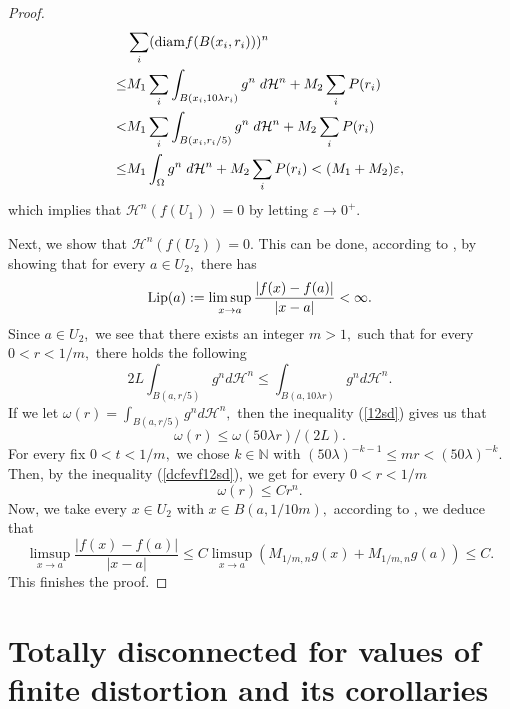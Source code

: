 \documentclass[11pt,twoside]{article}
\theoremstyle{definition}
\theoremstyle{remark}
\begin{document}
\begin{proof}
\begin{equation}
\begin{aligned}
&\sum_{i}({\rm diam}f(B(x_{i},r_{i})))^{n}\\
\leq& M_{1}\sum_{i}\int_{B(x_{i},10\lambda r_{i})}g^{n} \;d\mathcal{H}^{n}+M_{2}\sum_{i}P(r_{i})\\
<& M_{1}\sum_{i}\int_{B(x_{i}, r_{i}/5)}g^{n} \;d\mathcal{H}^{n} +M_{2}\sum_{i}P(r_{i})\\
\leq& M_{1}\int_{\Omega}g^{n} \;d\mathcal{H}^{n} +M_{2}\sum_{i}P(r_{i})<(M_{1}+M_{2})\varepsilon,\\
\end{aligned}
\end{equation}
which implies that $\mathcal{H}^{n}(f(U_{1}))=0$ by letting $\varepsilon\rightarrow0^{+}.$

Next, we show that $\mathcal{H}^{n}(f(U_{2}))=0.$ This can be done, according to \cite[Corollary 3.4 and Proposition 4.1.]{GO18}, by showing that for every 
$a\in U_{2},$ there has $${\rm Lip}(a):=\limsup_{x\rightarrow a}\frac{\vert{f(x)-f(a)\vert}}{\vert{x-a\vert}}<\infty.$$
Since $a\in U_{2},$ we see that there exists an integer $m>1,$ such that for every $0<r<1/m,$ there holds the following 
\begin{equation}\label{12sd}
2L\int_{B(a,r/5)}g^{n}d\mathcal{H}^{n}\leq\int_{B(a,10\lambda r)}g^{n}d\mathcal{H}^{n}.
\end{equation}\label{dcfevf12sd}
If we let $\omega(r)=\int_{B(a,r/5)}g^{n}d\mathcal{H}^{n},$ then the inequality (\ref{12sd}) gives us that 
\begin{equation}
\omega(r)\leq \omega(50\lambda r)/(2L).
\end{equation} For every fix $0<t<1/m,$ we chose 
$k\in \mathbb{N}$ with $(50\lambda)^{-k-1}\leq mr<(50\lambda)^{-k}.$ Then, by the inequality (\ref{dcfevf12sd}), we get for every $0<r<1/m$
$$\omega(r)\leq Cr^{n}.$$ Now, we take every $x\in U_{2}$ with $x\in B(a,1/10m),$ according to \cite[Lemma 4.6]{HKST01}, we deduce that 
$$\limsup_{x\rightarrow a}\frac{\vert f(x)-f(a)\vert}{\vert x-a\vert}\leq C\limsup_{x\rightarrow a}(M_{1/m,n}g(x)+M_{1/m,n}g(a))\leq C.$$
This finishes the proof.
\end{proof}




\section{Totally disconnected  for values of finite distortion and its corollaries}\label{sec3333}
\end{document}
